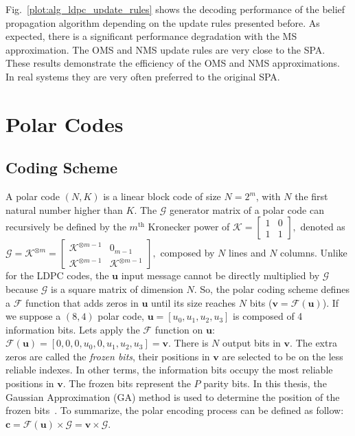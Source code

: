 Fig.~\ref{plot:alg_ldpc_update_rules} shows the decoding performance of the
belief propagation algorithm depending on the update rules presented before.
As expected, there is a significant performance degradation with the MS
approximation. The OMS and NMS update rules are very close to the SPA. These
results demonstrate the efficiency of the OMS and NMS approximations. In real
systems they are very often preferred to the original SPA.

\section{Polar Codes}
\label{sec:alg_polar}

\subsection{Coding Scheme}

A polar code $(N,K)$ is a linear block code of size $N = 2^m$, with $N$ the
first natural number higher than $K$. The $\bm{\mathcal{G}}$ generator matrix of
a polar code can recursively be defined by the $m^\text{th}$ Kronecker power of
$\bm{\mathcal{K}} =
\begin{bmatrix}
1 & 0 \\
1 & 1
\end{bmatrix},$
denoted as
$
\bm{\mathcal{G}} = \bm{\mathcal{K}}^{\otimes m} =
\begin{bmatrix}
\bm{\mathcal{K}}^{\otimes m-1} & 0_{m -1} \\
\bm{\mathcal{K}}^{\otimes m-1} & \bm{\mathcal{K}}^{\otimes m-1}
\end{bmatrix},
$
composed by $N$ lines and $N$ columns. Unlike for the LDPC codes, the $\bm{u}$
input message cannot be directly multiplied by $\bm{\mathcal{G}}$ because
$\bm{\mathcal{G}}$ is a square matrix of dimension $N$. So, the polar coding
scheme defines a $\mathcal{F}$ function that adds zeros in $\bm{u}$ until its
size reaches $N$ bits ($\bm{v} = \mathcal{F}(\bm{u})$). If we suppose a $(8,4)$
polar code, $\bm{u} = [u_0, u_1, u_2, u_3]$ is composed of 4 information bits.
Lets apply the $\mathcal{F}$ function on $\bm{u}$: $\mathcal{F}(\bm{u}) =
[0, 0, 0, u_0, 0, u_1, u_2, u_3] = \bm{v}$. There is $N$ output bits in
$\bm{v}$. The extra zeros are called the \emph{frozen bits}, their positions in
$\bm{v}$ are selected to be on the less reliable indexes. In other terms, the
information bits occupy the most reliable positions in $\bm{v}$. The frozen bits
represent the $P$ parity bits. In this thesis, the Gaussian Approximation (GA)
method is used to determine the position of the frozen bits~\cite{Trifonov2012}.
To summarize, the polar encoding process can be defined as follow: $\bm{c} =
\mathcal{F}(\bm{u}) \times \bm{\mathcal{G}} = \bm{v} \times \bm{\mathcal{G}}$.


